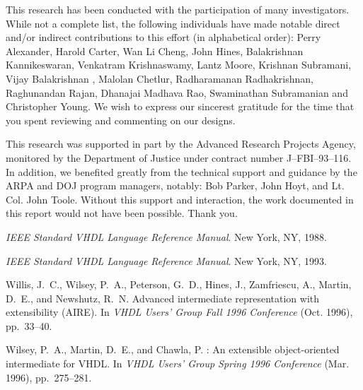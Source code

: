 \documentclass[11pt]{article}
\begin{document}
This research has been conducted with the participation of many
investigators.  While not a complete list, the following individuals
have made notable direct and/or indirect contributions to this effort
(in alphabetical order): Perry Alexander, Harold Carter, Wan Li Cheng,
John Hines, Balakrishnan Kannikeswaran, Venkatram Krishnaswamy, Lantz
Moore, Krishnan Subramani, Vijay Balakrishnan , Malolan Chetlur,
Radharamanan Radhakrishnan, Raghunandan Rajan, Dhanajai Madhava Rao,
Swaminathan Subramanian and Christopher Young.  We wish to express our
sincerest gratitude for the time that you spent reviewing and commenting
on our designs. 

This research was supported in part by the Advanced Research Projects
Agency, monitored by the Department of Justice under contract number
J--FBI--93--116.  In addition, we benefited greatly from the technical
support and guidance by the ARPA and DOJ program managers, notably: Bob
Parker, John Hoyt, and Lt. Col. John Toole.  Without this support and
interaction, the work documented in this report would not have been
possible.  Thank you.

%
%
\begin{thebibliography}{1}

{\em {IEEE} Standard {VHDL} Language Reference Manual}.
\newblock New York, NY, 1988.

{\em {IEEE} Standard {VHDL} Language Reference Manual}.
\newblock New York, NY, 1993.

{\sc Willis, J.~C., Wilsey, P.~A., Peterson, G.~D., Hines, J., Zamfriescu, A.,
  Martin, D.~E., and Newshutz, R.~N.}
\newblock Advanced intermediate representation with extensibility ({AIRE}).
\newblock In {\em {VHDL} Users' Group Fall 1996 Conference\/} (Oct. 1996),
  pp.~33--40.

{\sc Wilsey, P.~A., Martin, D.~E., and Chawla, P.}
: An extensible object-oriented intermediate for {VHDL}.
\newblock In {\em {VHDL} Users' Group Spring 1996 Conference\/} (Mar. 1996),
  pp.~275--281.

\end{thebibliography}
\end{document}
